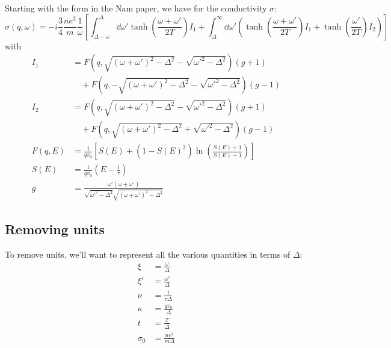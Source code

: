 \documentclass[../../main.tex]{subfiles}
\begin{document}
Starting with the form in the Nam paper, we have for the conductivity $\sigma$:
\begin{equation}
\sigma(q, \omega) = -i \frac34\frac{ n e^2}{ m} \frac{1}{\omega}\left[\int_{\Delta - \omega}^{\Delta}\dd{\omega'} \tanh(\frac{\omega + \omega'}{2T}) I_1 + \int_{\Delta}^{\infty} \dd{\omega'} \left( \tanh(\frac{\omega + \omega'}{2T}) I_1  + \tanh(\frac{\omega'}{2T})I_2 \right) \right]
\end{equation}
with 
\begin{align}
I_1 &= F(q, \sqrt{(\omega + \omega')^2 - \Delta^2} - \sqrt{\omega'^2 - \Delta^2}) (g + 1) \nonumber\\
&\quad + F(q, -\sqrt{(\omega + \omega')^2 - \Delta^2} - \sqrt{\omega'^2 - \Delta^2}) (g - 1) \\
I_2 &= F(q, \sqrt{(\omega + \omega')^2 - \Delta^2} - \sqrt{\omega'^2 - \Delta^2}) (g + 1) \nonumber\\
&\quad + F(q, \sqrt{(\omega + \omega')^2 - \Delta^2} + \sqrt{\omega'^2 - \Delta^2}) (g - 1) \\	
F(q, E) &= \frac{1}{q v_0} \left[S(E) + (1 - S(E)^2)\ln(\frac{S(E) + 1}{S(E) - 1})\right]  \\
S(E) &= \frac{1}{q v_0} \left(E - \frac{i}{\tau} \right) \\
g  &= \frac{\omega' \left( \omega + \omega'\right)}{\sqrt{\omega'^2 - \Delta^2}\sqrt{(\omega + \omega')^2 - \Delta^2}}
\end{align}

\subsection{Removing units}

To remove units, we'll want to represent all the various quantities in terms of $\Delta$:
\begin{align}
\xi &= \frac{\omega}{\Delta} \\
\xi' &= \frac{\omega'}{\Delta} \\
\nu &= \frac{1}{\tau \Delta} \\
\kappa &= \frac{q v_0}{\Delta} \\
t &= \frac{T}{\Delta} \\
\sigma_0 &= \frac{n e^2}{m \Delta}
\end{align}
\end{document}
